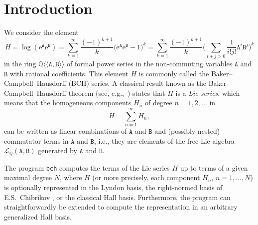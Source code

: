 \documentclass[11pt,a4paper]{article}
\newcommand{\nL}{\mathcal{L}}
\newcommand{\ee}{\mathrm{e}}
\renewcommand{\AA}{\mathtt{A}}
\newcommand{\BB}{\mathtt{B}}
\newcommand{\QQ}{\mathbb{Q}}
\begin{document}
\section{Introduction}
We consider the element 
\begin{equation}\label{eq:BCH_element}
H = \log(\ee^{\AA}\ee^{\BB})
= \sum_{k=1}^\infty\frac{(-1)^{k+1}}{k}\big(\ee^{\AA}\ee^{\BB}-1\big)^k
= \sum_{k=1}^\infty\frac{(-1)^{k+1}}{k}\bigg(\sum_{i+j>0}\frac{1}{i!j!}\AA^i\BB^j\bigg)^k %
\end{equation}
in the ring $\QQ\langle\langle\AA,\BB\rangle\rangle$  of formal power series 
in the non-commuting variables $\AA$ and $\BB$ with rational coefficients.
This element $H$ is commonly called the Baker--Campbell--Hausdorff (BCH) series. 
A classical result known as the
 Baker--Campbell--Hausdorff theorem (see, e.g.,~\cite{HHproof}) states that 
$H$
is a \emph{Lie series}, which means that the 
homogeneous components $H_n$ of degree $n=1,2,\dots$ in
\begin{equation}
H=\sum_{n=1}^\infty H_n, %
\end{equation}
can be written as  linear combinations of 
$\AA$ and $\BB$ and (possibly nested) 
 commutator terms in $\AA$ and $\BB$, i.e., they
 are 
elements of the
free Lie algebra $\nL_\QQ(\AA,\BB)$ %
generated by $\AA$ and $\BB$.  

The program \verb|bch| computes the terms of the Lie series $H$ 
up to terms of a given maximal degree $N$, where $H$ (or more precisely, each
component $H_n$, $n=1,\dots,N$) is optionally represented in the Lyndon basis, the right-normed
basis of E.S.~Chibrikov \cite{Chibrikov}, or the classical Hall basis. Furthermore, the program can straightforwardly
be extended to compute the representation in an arbitrary generalized Hall basis.
\end{document}
